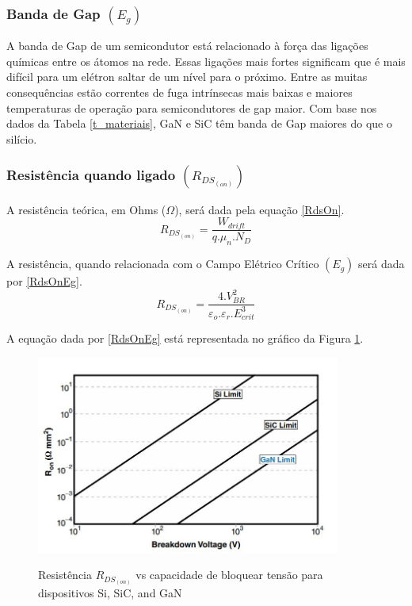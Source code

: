 \subsubsection{Banda de Gap $(E_g)$}
A banda de Gap de um semicondutor está relacionado à força das ligações químicas entre os átomos na rede. Essas ligações mais fortes significam que é mais difícil para um elétron saltar de um nível para o próximo. Entre as muitas consequências estão correntes de fuga intrínsecas mais baixas e maiores temperaturas de operação para semicondutores de gap maior. Com base nos dados da Tabela \ref{t_materiais}, GaN e SiC têm banda de Gap maiores do que o silício. \cite{lidow_rooij_strydom_reusch_glaser_2020}

\subsubsection{Resistência quando ligado $(R_{DS_{(on)}})$}
\par A resistência teórica, em Ohms ($\Omega$), será dada pela equação \ref{RdsOn}. \cite{lidow_rooij_strydom_reusch_glaser_2020}
\begin{equation}
    R_{DS_{(on)}} = \frac{W_{drift}}{q.\mu_n .N_D}
    \label{RdsOn}
\end{equation}
\par A resistência, quando relacionada com o Campo Elétrico Crítico $(E_g)$ será dada por \ref{RdsOnEg}. \cite{lidow_rooij_strydom_reusch_glaser_2020}
\begin{equation}
    R_{DS_{(on)}} = \frac{4.V^2_{BR}}{\varepsilon_o .\varepsilon_r . E^3_{crit}}
    \label{RdsOnEg}
\end{equation}
\par A equação dada por \ref{RdsOnEg} está representada no gráfico da Figura \ref{FigRDSon}.
\begin{figure}[H]
\caption{Resistência $R_{DS_(on)}$ vs capacidade de bloquear tensão para dispositivos Si, SiC, and GaN \cite{lidow_rooij_strydom_reusch_glaser_2020}}
 \centering %
\includegraphics[width=10cm]{figuras/5.JPG} 
\label{FigRDSon}
\end{figure}
